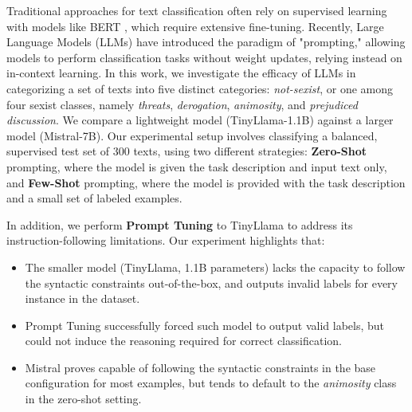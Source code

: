\documentclass[11pt]{article}
\begin{document}

Traditional approaches for text classification often rely on supervised learning with models like BERT \cite{bertmodel}, which require extensive fine-tuning. Recently, Large Language Models (LLMs) have introduced the paradigm of "prompting," allowing models to perform classification tasks without weight updates, relying instead on in-context learning.
In this work, we investigate the efficacy of LLMs in categorizing a set of texts into five distinct categories: \textit{not-sexist}, or one among four sexist classes, namely \textit{threats}, \textit{derogation}, \textit{animosity}, and \textit{prejudiced discussion}. We compare a lightweight model (TinyLlama-1.1B) against a larger model (Mistral-7B).
Our experimental setup involves classifying a balanced, supervised test set of 300 texts, using two different strategies: \textbf{Zero-Shot} prompting, where the model is given the task description and input text only, and \textbf{Few-Shot} prompting, where the model is provided with the task description and a small set of labeled examples.

In addition, we perform \textbf{Prompt Tuning} to TinyLlama to address its instruction-following limitations.
Our experiment highlights that:

\begin{itemize}
    \item The smaller model (TinyLlama, 1.1B parameters) lacks the capacity to follow the syntactic constraints out-of-the-box, and outputs invalid labels for every instance in the dataset.
    \item Prompt Tuning successfully forced such model to output valid labels, but could not induce the reasoning required for correct classification.
    \item Mistral proves capable of following the syntactic constraints in the base configuration for most examples, but tends to default to the \textit{animosity} class in the zero-shot setting.
\end{itemize}

\end{document}
